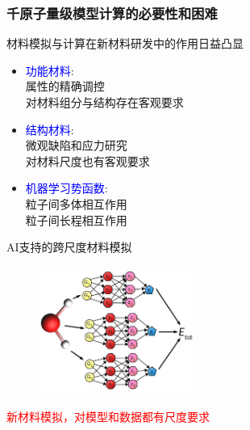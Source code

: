 \begin{frame}
	\frametitle{千原子量级模型计算的必要性和困难}
	材料模拟与计算在新材料研发中的作用日益凸显
\begin{minipage}[t]{0.51\textwidth}
	\begin{itemize}
		\item \textcolor{blue}{功能材料}:\\
			属性的精确调控\\
			对材料组分与结构存在客观要求
		\item \textcolor{blue}{结构材料}:\\
			微观缺陷和应力研究\\
			对材料尺度也有客观要求
		\item \textcolor{blue}{机器学习势函数}:\\
			粒子间多体相互作用\\
			粒子间长程相互作用
	\end{itemize}
\end{minipage}
\begin{minipage}[t]{0.47\textwidth}
	\vskip 5pt
\textrm{AI}支持的跨尺度材料模拟
\begin{figure}[h!]
\vspace*{-0.15in}
\includegraphics[height=1.64in,width=2.00in]{Figures/MLP_GNN.jpg}
\label{Multi-Scale-4}
\end{figure}
\end{minipage}
	\vskip 5pt
	\textcolor{red}{\hskip 60pt 新材料模拟，对模型和数据都有尺度要求}
\end{frame}

